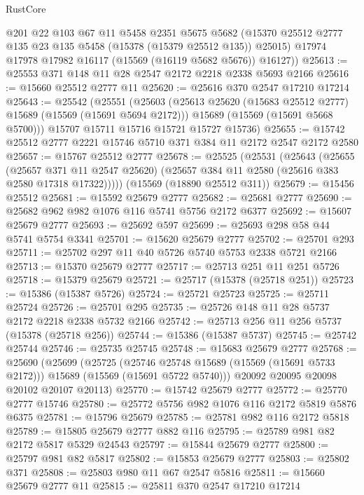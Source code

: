 \begin{lexlean}{RustCore}
\begin{coremodule}
        @201
        @22
        @103
        @67
        @11
        @5458
        @2351
        @5675
        @5682
        (@15370 @25512 @2777 @135 @23 @135 @5458 (@15378 (@15379 @25512 @135)) @25015)
        @17974
        @17978
        @17982
        @16117
        (@15569 (@16119 @5682 @5676))
        @16127))
@25613 := @25553 @371 @148 @11 @28 @2547 @2172 @2218 @2338 @5693 @2166
@25616 := @15660 @25512 @2777 @11
@25620 := @25616 @370 @2547 @17210 @17214
@25643 := @25542
    (@25551
      (@25603
        (@25613 @25620 (@15683 @25512 @2777) @15689 (@15569 (@15691 @5694 @2172)))
        @15689
        (@15569 (@15691 @5668 @5700)))
      @15707
      @15711
      @15716
      @15721
      @15727
      @15736)
@25655 := @15742 @25512 @2777 @2221 @15746 @5710 @371 @384 @11 @2172 @2547 @2172 @2580
@25657 := @15767 @25512 @2777
@25678 := @25525
    (@25531
      (@25643
        (@25655
          (@25657 @371 @11 @2547 @25620)
          (@25657 @384 @11 @2580 (@25616 @383 @2580 @17318 @17322)))))
    (@15569 (@18890 @25512 @311))
@25679 := @15456 @25512
@25681 := @15592 @25679 @2777
@25682 := @25681 @2777
@25690 := @25682 @962 @982 @1076 @116 @5741 @5756 @2172 @6377
@25692 := @15607 @25679 @2777
@25693 := @25692 @597
@25699 := @25693 @298 @58 @44 @5741 @5754 @3341
@25701 := @15620 @25679 @2777
@25702 := @25701 @293
@25711 := @25702 @297 @11 @40 @5726 @5740 @5753 @2338 @5721 @2166
@25713 := @15370 @25679 @2777
@25717 := @25713 @251 @11 @251 @5726
@25718 := @15379 @25679
@25721 := @25717 (@15378 (@25718 @251))
@25723 := @15386 (@15387 @5726)
@25724 := @25721 @25723
@25725 := @25711 @25724
@25726 := @25701 @295
@25735 := @25726 @148 @11 @28 @5737 @2172 @2218 @2338 @5732 @2166
@25742 := @25713 @256 @11 @256 @5737 (@15378 (@25718 @256))
@25744 := @15386 (@15387 @5737)
@25745 := @25742 @25744
@25746 := @25735 @25745
@25748 := @15683 @25679 @2777
@25768 := @25690
    (@25699
      (@25725
        (@25746 @25748 @15689 (@15569 (@15691 @5733 @2172)))
        @15689
        (@15569 (@15691 @5722 @5740)))
      @20092
      @20095
      @20098
      @20102
      @20107
      @20113)
@25770 := @15742 @25679 @2777
@25772 := @25770 @2777 @15746
@25780 := @25772 @5756 @982 @1076 @116 @2172 @5819 @5876 @6375
@25781 := @15796 @25679
@25785 := @25781 @982 @116 @2172 @5818
@25789 := @15805 @25679 @2777 @882 @116
@25795 := @25789 @981 @82 @2172 @5817 @5329 @24543
@25797 := @15844 @25679 @2777
@25800 := @25797 @981 @82 @5817
@25802 := @15853 @25679 @2777
@25803 := @25802 @371
@25808 := @25803 @980 @11 @67 @2547 @5816
@25811 := @15660 @25679 @2777 @11
@25815 := @25811 @370 @2547 @17210 @17214

\end{coremodule}
\end{lexlean}
